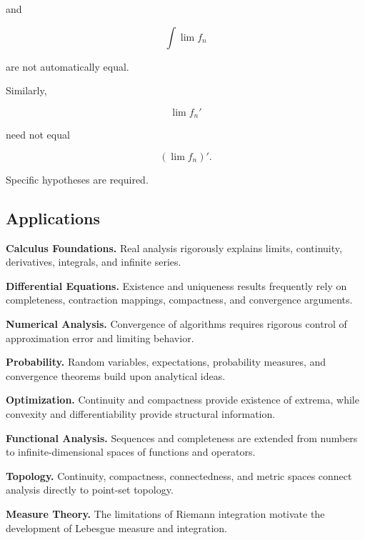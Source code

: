 and

\[
\int\lim f_n
\]

are not automatically equal.

Similarly,

\[
\lim f_n'
\]

need not equal

\[
\left(\lim f_n\right)'.
\]

Specific hypotheses are required.

\subsection{Applications}
\label{subsec:real-analysis-applications}

\begin{applicationbox}
\textbf{Calculus Foundations.}
Real analysis rigorously explains limits, continuity, derivatives,
integrals, and infinite series.

\medskip

\textbf{Differential Equations.}
Existence and uniqueness results frequently rely on completeness,
contraction mappings, compactness, and convergence arguments.

\medskip

\textbf{Numerical Analysis.}
Convergence of algorithms requires rigorous control of approximation error
and limiting behavior.

\medskip

\textbf{Probability.}
Random variables, expectations, probability measures, and convergence
theorems build upon analytical ideas.

\medskip

\textbf{Optimization.}
Continuity and compactness provide existence of extrema, while convexity
and differentiability provide structural information.

\medskip

\textbf{Functional Analysis.}
Sequences and completeness are extended from numbers to infinite-dimensional
spaces of functions and operators.

\medskip

\textbf{Topology.}
Continuity, compactness, connectedness, and metric spaces connect analysis
directly to point-set topology.

\medskip

\textbf{Measure Theory.}
The limitations of Riemann integration motivate the development of
Lebesgue measure and integration.
\end{applicationbox}


